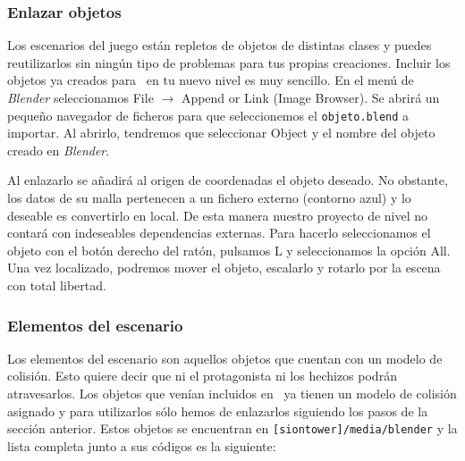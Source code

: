 \documentclass[a4paper,11pt]{article}
\begin{document}
\subsubsection{Enlazar objetos}

Los escenarios del juego están repletos de objetos de distintas clases
y puedes reutilizarlos sin ningún tipo de problemas para tus propias creaciones.
Incluir los objetos ya creados para \juego\ en tu nuevo nivel es muy sencillo.
En el menú de \textit{Blender} seleccionamos File $\rightarrow$ Append or
Link (Image Browser). Se abrirá un pequeño navegador de ficheros para
que seleccionemos el \texttt{objeto.blend} a importar. Al abrirlo, tendremos
que seleccionar Object y el nombre del objeto creado en \textit{Blender}.


Al enlazarlo se añadirá al origen de coordenadas el objeto deseado. No obstante,
los datos de su malla pertenecen a un fichero externo (contorno azul) y lo
deseable es convertirlo en local. De esta manera nuestro proyecto de nivel
no contará con indeseables dependencias externas. Para hacerlo
seleccionamos el objeto con el botón derecho del ratón, pulsamos L y
seleccionamos la opción All. Una vez localizado, podremos mover el objeto,
escalarlo y rotarlo por la escena con total libertad.


\subsubsection{Elementos del escenario}

Los elementos del escenario son aquellos objetos que cuentan con un modelo
de colisión. Esto quiere decir que ni el protagonista ni los hechizos podrán
atravesarlos. Los objetos que venían incluidos en \juego\ ya tienen un modelo
de colisión asignado y para utilizarlos sólo hemos de enlazarlos siguiendo
los pasos de la sección anterior. Estos objetos se encuentran en
\texttt{[siontower]/media/blender} y la lista completa junto a sus códigos
es la siguiente:
\end{document}
